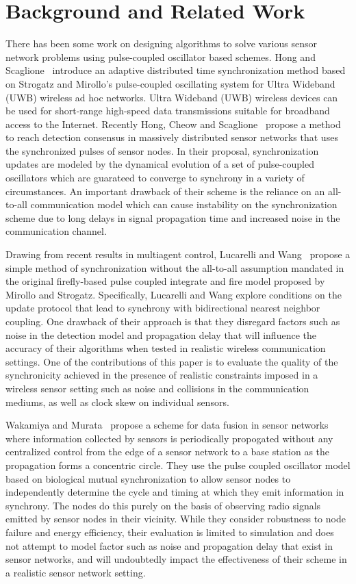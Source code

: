 
\section{Background and Related Work}
\label{sec:background}

There has been some work on designing algorithms to solve various sensor network
problems using pulse-coupled oscillator based schemes.
Hong and Scaglione~\cite{ssp03, tsrbc03} introduce an adaptive distributed time
synchronization method based on Strogatz and Mirollo's pulse-coupled 
oscillating system for Ultra Wideband (UWB) wireless ad hoc networks.  
Ultra Wideband (UWB) wireless devices can be used for short-range high-speed 
data transmissions suitable for broadband access to the Internet.
Recently Hong, Cheow and Scaglione~\cite{hcs04} propose a method to reach detection
consensus in massively distributed sensor networks that uses the synchronized
pulses of sensor nodes. In their proposal, synchronization updates are modeled 
by the dynamical evolution of a set of pulse-coupled oscillators which are 
guarateed to converge to synchrony in a variety of circumstances.  
An important drawback of their scheme is the reliance on an all-to-all communication
model which can cause instability on the synchronization scheme due to long
delays in signal propagation time and increased noise in the communication
channel.

Drawing from recent results in multiagent control, Lucarelli and Wang~\cite{lw04}
propose a simple method of synchronization without the all-to-all assumption 
mandated in the original firefly-based pulse coupled integrate and fire model
proposed by Mirollo and Strogatz.
Specifically, Lucarelli and Wang explore conditions on the update protocol that lead to synchrony
with bidirectional nearest neighbor coupling.  
One drawback of their approach is that they disregard factors such as noise 
in the detection model and propagation delay that will influence the accuracy of their algorithms
when tested in realistic wireless communication settings.  One of the contributions
of this paper is to evaluate the quality of the synchronicity achieved
in the presence of realistic constraints imposed in a wireless sensor setting
such as noise and collisions in the communication mediums, as well as clock skew
on individual sensors.

Wakamiya and Murata~\cite{wm04} propose a scheme for data fusion in sensor networks where information
collected by sensors is periodically propogated without any centralized control
from the edge of a sensor network to a base station as the propagation forms a concentric
circle. They use the pulse coupled oscillator model based on biological mutual
synchronization to allow sensor nodes to independently determine the cycle and timing
at which they emit information in synchrony. The nodes do this purely on the basis of 
observing radio signals emitted by sensor nodes in their vicinity. While they
consider robustness to node failure and energy efficiency, their evaluation is limited
to simulation and does not attempt to model factor such as noise and propagation delay
that exist in sensor networks, and will undoubtedly impact the effectiveness of 
their scheme in a realistic sensor network setting.

